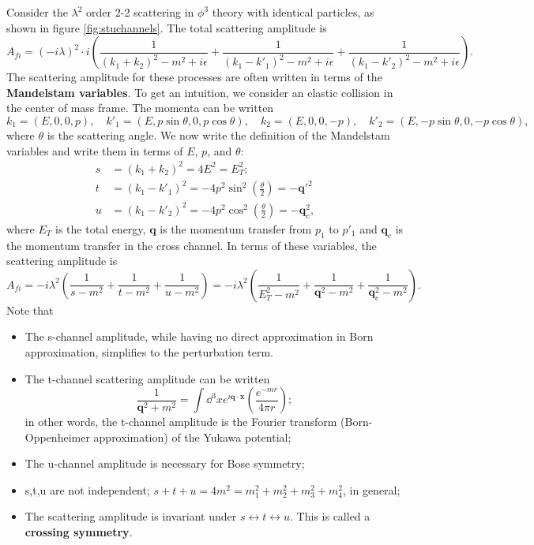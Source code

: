 \documentclass{article}
\begin{document}
\example Consider the $\lambda^2$ order 2-2 scattering in $\phi^3$ theory with identical particles, as shown in figure \ref{fig:stuchannels}. The total scattering amplitude is 
$$A_{fi}=(-i\lambda)^2\cdot i\left(\frac{1}{(k_1+k_2)^2-m^2+i\epsilon}+\frac{1}{(k_1-k'_1)^2-m^2+i\epsilon}+\frac 1{(k_1-k'_2)^2-m^2+i\epsilon}\right).$$
The scattering amplitude for these processes are often written in terms of the \textbf{Mandelstam variables}. To get an intuition, we consider an elastic collision in the center of mass frame. The momenta can be written 
$$k_1=(E,0,0,p),\quad k'_1=(E,p\sin\theta,0,p\cos\theta),\quad k_2=(E,0,0,-p),\quad k'_2=(E,-p\sin\theta,0,-p\cos\theta),$$
where $\theta$ is the scattering angle. We now write the definition of the Mandelstam variables and write them in terms of $E$, $p$, and $\theta$:
\begin{align*}
    s&=(k_1+k_2)^2=4E^2=E_T^2;\\
    t&=(k_1-k'_1)^2=-4p^2\sin^2\left(\frac\theta 2\right)=-\mathbf q'^2\\
    u&=(k_1-k'_2)^2=-4p^2\cos^2\left(\frac\theta 2\right)=-\mathbf q_c^2,
\end{align*}
where $E_T$ is the total energy, $\mathbf q$ is the momentum transfer from $p_1$ to $p'_1$ and $\mathbf q_c$ is the momentum transfer in the cross channel. In terms of these variables, the scattering amplitude is 
$$A_{fi}=-i\lambda^2\left(\frac 1{s-m^2}+\frac 1{t-m^2}+\frac 1{u-m^2}\right)=-i\lambda^2\left(\frac 1{E_T^2-m^2}+\frac 1{\mathbf q^2-m^2}+\frac 1{\mathbf q_c^2-m^2}\right).$$
Note that
\begin{itemize}
    \item The s-channel amplitude, while having no direct approximation in Born approximation, simplifies to the perturbation term.
    \item The t-channel scattering amplitude can be written 
    $$\frac 1{\mathbf q^2+m^2}=\int\dd^3xe^{i\mathbf q\cdot\mathbf x}\left(\frac{e^{-mr}}{4\pi r}\right);$$
    in other words, the t-channel amplitude is the Fourier transform (Born-Oppenheimer approximation) of the Yukawa potential;
    \item The u-channel amplitude is necessary for Bose symmetry;
    \item s,t,u are not independent; $s+t+u=4m^2=m^2_1+m_2^2+m_3^2+m_4^2$, in general;
    \item The scattering amplitude is invariant under $s\leftrightarrow t\leftrightarrow u$. This is called a \textbf{crossing symmetry}. 
\end{itemize}
\end{document}
